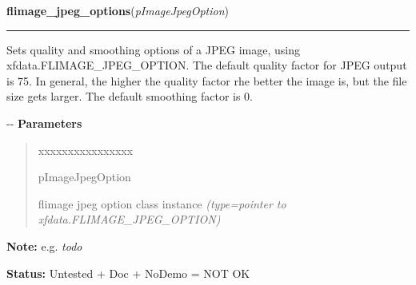     \label{xformslib:flflimage:flimage_jpeg_output_options}

    \vspace{0.5ex}

\hspace{.8\funcindent}\begin{boxedminipage}{\funcwidth}

    \raggedright \textbf{flimage\_jpeg\_options}(\textit{pImageJpegOption})

    \vspace{-1.5ex}

    \rule{\textwidth}{0.5\fboxrule}
\setlength{\parskip}{2ex}

Sets quality and smoothing options of a JPEG image, using
xfdata.FLIMAGE\_JPEG\_OPTION. The default quality factor for JPEG output
is 75. In general, the higher the quality factor rhe better the image
is, but the file size gets larger. The default smoothing factor is 0.

-{}-
\setlength{\parskip}{1ex}
      \textbf{Parameters}
      \vspace{-1ex}

      \begin{quote}
        \begin{Ventry}{xxxxxxxxxxxxxxxx}

          \item[pImageJpegOption]


flimage jpeg option class instance
            {\it (type=pointer to xfdata.FLIMAGE\_JPEG\_OPTION)}

        \end{Ventry}

      \end{quote}

\textbf{Note:} 
e.g. \emph{todo}


\textbf{Status:} 
Untested + Doc + NoDemo = NOT OK


    \end{boxedminipage}

    \label{xformslib:flflimage:flimage_pnm_output_options}

    \vspace{0.5ex}

